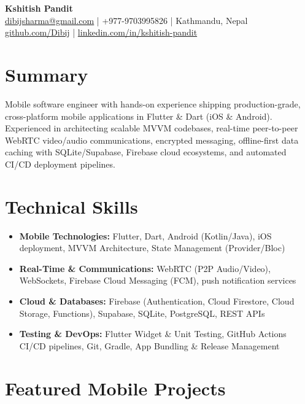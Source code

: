 \documentclass[a4paper,10pt]{article}
\begin{document}
\begin{center}
    {\LARGE \textbf{Kshitish Pandit}} \\[4pt]
    \href{mailto:dibijsharma@gmail.com}{dibijsharma@gmail.com} \quad | \quad +977-9703995826 \quad | \quad Kathmandu, Nepal \\[2pt]
    \href{https://github.com/Dibij}{github.com/Dibij} \quad | \quad
    \href{https://www.linkedin.com/in/kshitish-pandit}{linkedin.com/in/kshitish-pandit}
\end{center}

\vspace{2pt}

\section*{Summary}
Mobile software engineer with hands-on experience shipping production-grade, cross-platform mobile applications in Flutter \& Dart (iOS \& Android). Experienced in architecting scalable MVVM codebases, real-time peer-to-peer WebRTC video/audio communications, encrypted messaging, offline-first data caching with SQLite/Supabase, Firebase cloud ecosystems, and automated CI/CD deployment pipelines.

\section*{Technical Skills}
\begin{itemize}
    \item \textbf{Mobile Technologies:} Flutter, Dart, Android (Kotlin/Java), iOS deployment, MVVM Architecture, State Management (Provider/Bloc)
    \item \textbf{Real-Time \& Communications:} WebRTC (P2P Audio/Video), WebSockets, Firebase Cloud Messaging (FCM), push notification services
    \item \textbf{Cloud \& Databases:} Firebase (Authentication, Cloud Firestore, Cloud Storage, Functions), Supabase, SQLite, PostgreSQL, REST APIs
    \item \textbf{Testing \& DevOps:} Flutter Widget \& Unit Testing, GitHub Actions CI/CD pipelines, Git, Gradle, App Bundling \& Release Management
\end{itemize}

\section*{Featured Mobile Projects}
\end{document}
